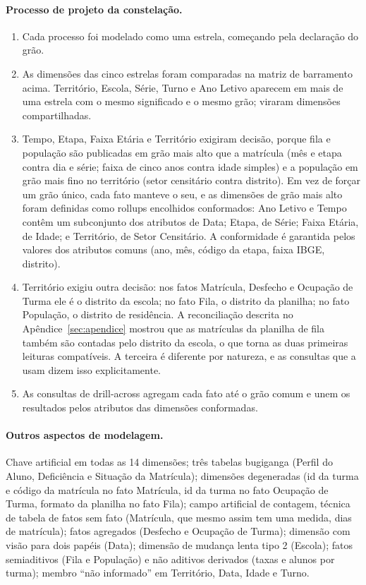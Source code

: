 \documentclass[11pt,a4paper]{article}
\begin{document}
\paragraph{Processo de projeto da constelação.}
\begin{enumerate}
\item Cada processo foi modelado como uma estrela, começando pela declaração do grão.
\item As dimensões das cinco estrelas foram comparadas na matriz de barramento acima. Território, Escola, Série, Turno e Ano Letivo aparecem em mais de uma estrela com o mesmo significado e o mesmo grão; viraram dimensões compartilhadas.
\item Tempo, Etapa, Faixa Etária e Território exigiram decisão, porque fila e população são publicadas em grão mais alto que a matrícula (mês e etapa contra dia e série; faixa de cinco anos contra idade simples) e a população em grão mais fino no território (setor censitário contra distrito). Em vez de forçar um grão único, cada fato manteve o seu, e as dimensões de grão mais alto foram definidas como rollups encolhidos conformados: Ano Letivo e Tempo contêm um subconjunto dos atributos de Data; Etapa, de Série; Faixa Etária, de Idade; e Território, de Setor Censitário. A conformidade é garantida pelos valores dos atributos comuns (ano, mês, código da etapa, faixa IBGE, distrito).
\item Território exigiu outra decisão: nos fatos Matrícula, Desfecho e Ocupação de Turma ele é o distrito da escola; no fato Fila, o distrito da planilha; no fato População, o distrito de residência. A reconciliação descrita no Apêndice~\ref{sec:apendice} mostrou que as matrículas da planilha de fila também são contadas pelo distrito da escola, o que torna as duas primeiras leituras compatíveis. A terceira é diferente por natureza, e as consultas que a usam dizem isso explicitamente.
\item As consultas de drill-across agregam cada fato até o grão comum e unem os resultados pelos atributos das dimensões conformadas.
\end{enumerate}

\paragraph{Outros aspectos de modelagem.} Chave artificial em todas as 14 dimensões; três tabelas bugiganga (Perfil do Aluno, Deficiência e Situação da Matrícula); dimensões degeneradas (id da turma e código da matrícula no fato Matrícula, id da turma no fato Ocupação de Turma, formato da planilha no fato Fila); campo artificial de contagem, técnica de tabela de fatos sem fato (Matrícula, que mesmo assim tem uma medida, dias de matrícula); fatos agregados (Desfecho e Ocupação de Turma); dimensão com visão para dois papéis (Data); dimensão de mudança lenta tipo 2 (Escola); fatos semiaditivos (Fila e População) e não aditivos derivados (taxas e alunos por turma); membro ``não informado'' em Território, Data, Idade e Turno.
\end{document}

